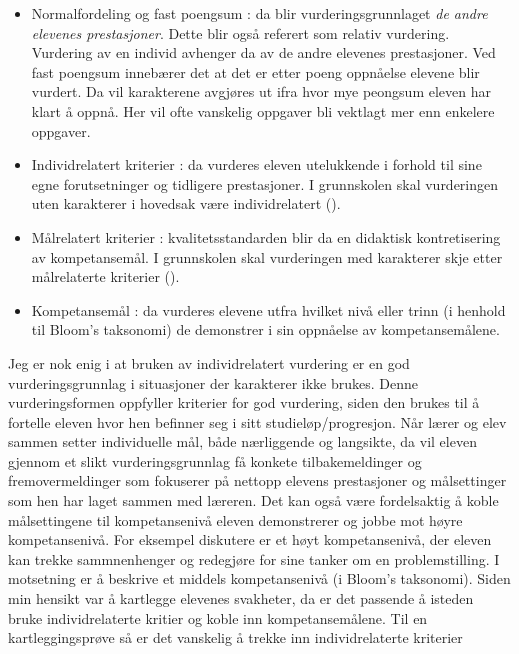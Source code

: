 \documentclass[main.tex]{subfiles}
\begin{document}
\begin{itemize}
\item Normalfordeling og fast poengsum : da blir vurderingsgrunnlaget \emph{de andre elevenes prestasjoner}. 
Dette blir også referert som relativ vurdering. Vurdering av en individ avhenger da av de andre
elevenes prestasjoner. Ved fast poengsum innebærer det at det er etter poeng oppnåelse elevene blir vurdert. 
Da vil karakterene avgjøres ut ifra hvor mye peongsum eleven har klart å oppnå. Her vil ofte vanskelig oppgaver
bli vektlagt mer enn enkelere oppgaver.
\item Individrelatert kriterier : da vurderes eleven utelukkende i forhold til sine egne forutsetninger
og tidligere prestasjoner. I grunnskolen skal vurderingen uten karakterer i hovedsak være 
individrelatert  ().
\item Målrelatert kriterier : kvalitetsstandarden blir da en didaktisk kontretisering av kompetansemål.
 I grunnskolen skal vurderingen med karakterer skje etter målrelaterte kriterier ().
\item Kompetansemål : da vurderes elevene utfra hvilket nivå eller trinn (i henhold til Bloom's taksonomi) 
                      de demonstrer i sin oppnåelse av kompetansemålene.
\end{itemize}
Jeg er nok enig i at bruken av individrelatert vurdering er en god vurderingsgrunnlag i situasjoner
der karakterer ikke brukes. Denne vurderingsformen oppfyller kriterier for god vurdering,
siden den brukes til å fortelle eleven hvor hen befinner seg i sitt studieløp/progresjon.
Når lærer og elev sammen setter individuelle mål, både nærliggende og langsikte, da vil eleven
gjennom et slikt vurderingsgrunnlag få konkete tilbakemeldinger og fremovermeldinger som 
fokuserer på nettopp elevens prestasjoner og målsettinger som hen har laget sammen med
læreren. Det kan også være fordelsaktig å koble målsettingene til kompetansenivå eleven demonstrerer
og jobbe mot høyre kompetansenivå. For eksempel diskutere er et høyt kompetansenivå, der eleven 
kan trekke sammnenhenger og redegjøre for sine tanker om en problemstilling. I motsetning er
å beskrive et middels kompetansenivå (i Bloom's taksonomi).
\newline
\newline
Siden min hensikt var å kartlegge elevenes svakheter, da er det passende å isteden bruke individrelaterte kritier 
og koble inn kompetansemålene. Til en kartleggingsprøve så er det vanskelig å trekke inn individrelaterte kriterier
\end{document}

